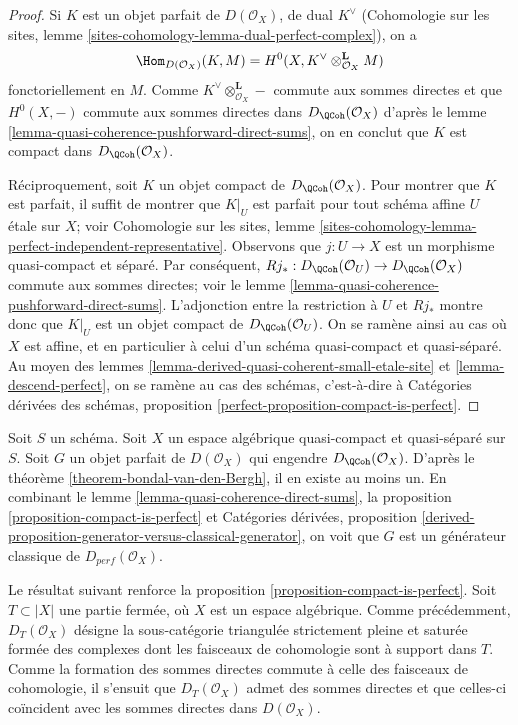 \begin{proof}
Si $K$ est un objet parfait de $D(\mathcal{O}_X)$, de dual
$K^\vee$ (Cohomologie sur les sites, lemme
\ref{sites-cohomology-lemma-dual-perfect-complex}),
on a
$$
\Hom_{D(\mathcal{O}_X)}(K, M) =
H^0(X, K^\vee \otimes_{\mathcal{O}_X}^\mathbf{L} M)
$$
fonctoriellement en $M$. Comme $K^\vee \otimes_{\mathcal{O}_X}^\mathbf{L} -$
commute aux sommes directes et que $H^0(X, -)$ commute aux sommes
directes dans $D_\QCoh(\mathcal{O}_X)$ d'apr\`es le
lemme \ref{lemma-quasi-coherence-pushforward-direct-sums},
on en conclut que $K$ est compact dans $D_\QCoh(\mathcal{O}_X)$.

\medskip\noindent
R\'eciproquement, soit $K$ un objet compact de $D_\QCoh(\mathcal{O}_X)$.
Pour montrer que $K$ est parfait, il suffit de montrer que
$K|_U$ est parfait pour tout sch\'ema affine $U$ \'etale sur $X$; voir
Cohomologie sur les sites, lemme
\ref{sites-cohomology-lemma-perfect-independent-representative}.
Observons que $j : U \to X$ est un morphisme quasi-compact et s\'epar\'e.
Par cons\'equent,
$Rj_* : D_\QCoh(\mathcal{O}_U) \to D_\QCoh(\mathcal{O}_X)$
commute aux sommes directes; voir le
lemme \ref{lemma-quasi-coherence-pushforward-direct-sums}.
L'adjonction entre la restriction \`a $U$ et $Rj_*$ montre donc que
$K|_U$ est un objet compact de $D_\QCoh(\mathcal{O}_U)$.
On se ram\`ene ainsi au cas o\`u $X$ est affine, et en particulier \`a celui
d'un sch\'ema quasi-compact et quasi-s\'epar\'e. Au moyen des
lemmes \ref{lemma-derived-quasi-coherent-small-etale-site} et
\ref{lemma-descend-perfect},
on se ram\`ene au cas des sch\'emas, c'est-\`a-dire \`a
Cat\'egories d\'eriv\'ees des sch\'emas, proposition
\ref{perfect-proposition-compact-is-perfect}.
\end{proof}

\begin{remark}
\label{remark-classical-generator}
Soit $S$ un sch\'ema.
Soit $X$ un espace alg\'ebrique quasi-compact et quasi-s\'epar\'e sur $S$.
Soit $G$ un
objet parfait de $D(\mathcal{O}_X)$ qui engendre
$D_\QCoh(\mathcal{O}_X)$. D'apr\`es le th\'eor\`eme
\ref{theorem-bondal-van-den-Bergh}, il en existe au moins un. En combinant
le lemme \ref{lemma-quasi-coherence-direct-sums}, la
proposition \ref{proposition-compact-is-perfect} et
Cat\'egories d\'eriv\'ees, proposition
\ref{derived-proposition-generator-versus-classical-generator},
on voit que $G$ est un g\'en\'erateur classique de
$D_{perf}(\mathcal{O}_X)$.
\end{remark}

\noindent
Le r\'esultat suivant renforce la
proposition \ref{proposition-compact-is-perfect}.
Soit $T \subset |X|$ une partie ferm\'ee, o\`u $X$ est un espace alg\'ebrique.
Comme pr\'ec\'edemment, $D_T(\mathcal{O}_X)$ d\'esigne la sous-cat\'egorie
triangul\'ee strictement pleine et satur\'ee form\'ee des complexes dont les
faisceaux de cohomologie sont \`a support dans $T$. Comme la formation des
sommes directes commute \`a celle des faisceaux de cohomologie, il s'ensuit
que $D_T(\mathcal{O}_X)$ admet des sommes directes et que celles-ci co\"incident
avec les sommes directes dans $D(\mathcal{O}_X)$.

